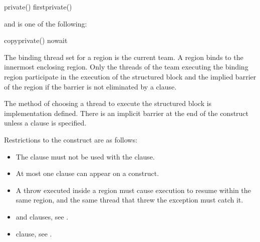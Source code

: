 \begin{indentedcodelist}
private()
firstprivate()
\end{indentedcodelist}

and  is one of the following: 

\begin{indentedcodelist}
copyprivate()
nowait
\end{indentedcodelist}
\fortranspecificend

\binding
The binding thread set for a  region is the current team. A  region 
binds to the innermost enclosing  region. Only the threads of the team 
executing the binding  region participate in the execution of the structured 
block and the implied barrier of the  region if the barrier is not eliminated by a 
 clause.

\descr
The method of choosing a thread to execute the structured block is implementation 
defined. There is an implicit barrier at the end of the  construct unless a 
 clause is specified. 

\restrictions
Restrictions to the  construct are as follows: 

\begin{itemize}
\item The  clause must not be used with the  clause.

\item At most one  clause can appear on a  construct.

\cppspecificstart
\item A throw executed inside a  region must cause execution to resume within the 
same  region, and the same thread that threw the exception must catch it.
\cppspecificend
\end{itemize}


\crossreferences
\begin{itemize}
\item {} and  clauses, see 
.

\item {} clause, see 
.
\end{itemize}













